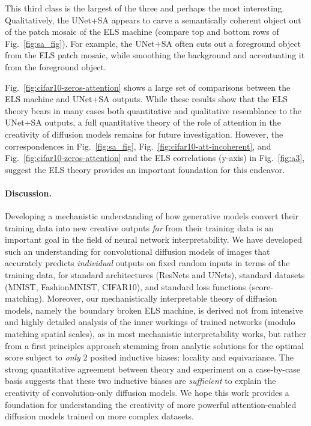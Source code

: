 \documentclass{article}
\theoremstyle{plain}
\theoremstyle{definition}
\theoremstyle{remark}
\begin{document}
This third class is the largest of the three and perhaps the most interesting. Qualitatively, the UNet+SA appears to carve a semantically coherent object out of the patch mosaic of the ELS machine (compare top and bottom rows of Fig.~\ref{fig:sa_fig}). For example, the UNet+SA often cuts out a foreground object from the ELS patch mosaic, while smoothing the background and accentuating it from the foreground object.

Fig.~\ref{fig:cifar10-zeros-attention} shows a large set of comparisons between the ELS machine and UNet+SA outputs.  While these results show that the ELS theory bears in many cases both quantitative and qualitative resemblance to the UNet+SA outputs, a full quantitative theory of the role of attention in the creativity of diffusion models remains for future investigation.  However, the correspondences in Fig.~\ref{fig:sa_fig}, Fig.~\ref{fig:cifar10-att-incoherent}, and Fig.~\ref{fig:cifar10-zeros-attention} and the ELS correlations (y-axis) in Fig.~\ref{fig:a3}, suggest the ELS theory provides an important foundation for this endeavor. 


\vspace{-1em}
\paragraph{Discussion.}
Developing a mechanistic understanding of how generative models convert their training data into new creative outputs {\it far} from their training data is an important goal in the field of neural network interpretability.  We have developed such an understanding for convolutional diffusion models of images that accurately predicts {\it individual} outputs on fixed random inputs in terms of the training data, for standard architectures (ResNets and UNets), standard datasets (MNIST, FashionMNIST, CIFAR10), and standard loss functions (score-matching). Moreover, our mechanistically interpretable theory of diffusion models, namely the boundary broken ELS machine, is derived not from intensive and highly detailed analysis of the inner workings of trained networks (modulo matching spatial scales), as in most mechanistic interpretability works, but rather from a first principles approach stemming from analytic solutions for the optimal score subject to {\it only} $2$ posited inductive biases: locality and equivariance. The strong quantitative agreement between theory and experiment on a case-by-case basis suggests that these two inductive biases are {\it sufficient} to explain the creativity of convolution-only diffusion models. We hope this work provides a foundation for understanding the creativity of more powerful attention-enabled diffusion models trained on more complex datasets. 
\end{document}
